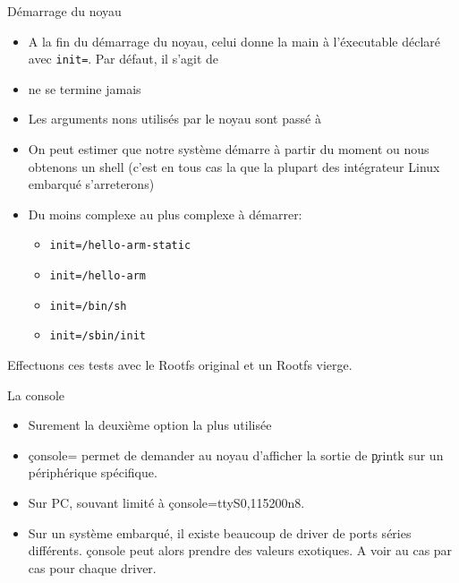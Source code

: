 \begin{frame}[fragile=singleslide]{Démarrage du noyau}
  \begin{itemize}
  \item  A  la fin  du  démarrage  du noyau,  celui  donne  la main  à
    l'éxecutable déclaré  avec \verb+init=+. Par défaut,  il s'agit de
  \item {} ne se termine jamais
  \item  Les  arguments  nons  utilisés  par le  noyau  sont  passé  à
  \item On peut  estimer que notre système démarre  à partir du moment
    ou nous  obtenons un shell (c'est  en tous cas  la que la
      plupart des intégrateur Linux embarqué s'arreterons)
  \item Du moins complexe au plus complexe à démarrer:
  \begin{itemize}
    \item \verb+init=/hello-arm-static+
    \item \verb+init=/hello-arm+
    \item \verb+init=/bin/sh+
    \item \verb+init=/sbin/init+
    \end{itemize}
  \end{itemize}
  Effectuons ces tests avec le Rootfs original et un Rootfs vierge.
\end{frame}

\begin{frame}[fragile=singleslide]{La console}
  \begin{itemize} 
    \item Surement la deuxième option la plus utilisée
    \item  \c{console=}  permet de  demander  au  noyau d'afficher  la
      sortie de \c{printk} sur un périphérique spécifique.
    \item Sur PC, souvant limité à \c{console=ttyS0,115200n8}.
    \item Sur  un système  embarqué, il existe  beaucoup de  driver de
      ports  séries différents.   \c{console} peut  alors  prendre des
      valeurs exotiques. A voir au cas par cas pour chaque driver.
  \end{itemize} 
\end{frame} 

